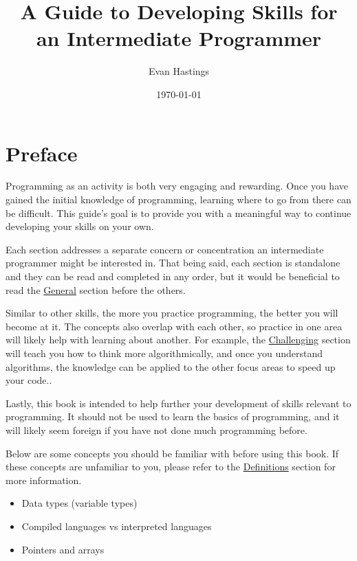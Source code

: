 \documentclass[12pt, oneside, a4paper]{book}
\title{A Guide to Developing Skills for an Intermediate Programmer}
\date{\today}
\author{Evan Hastings}
\begin{document}
   \maketitle
   \newpage
   \tableofcontents
   \lstlistoflistings
   \listoftables

   \chapter*{Preface}
      Programming as an activity is both very engaging and rewarding.
      Once you have gained the initial knowledge of programming, learning where to go from there can be difficult.
      This guide's goal is to provide you with a meaningful way to continue developing your skills on your own.

      Each section addresses a separate concern or concentration an intermediate programmer might be interested in.
      That being said, each section is standalone and they can be read and completed in any order, but it would be beneficial to read the \hyperref[chap:general]{General} section before the others.

      Similar to other skills, the more you practice programming, the better you will become at it.
      The concepts also overlap with each other, so practice in one area will likely help with learning about another.
      For example, the \hyperref[chap:challenge]{Challenging} section will teach you how to think more algorithmically, and once you understand algorithms, the knowledge can be applied to the other focus areas to speed up your code..

      Lastly, this book is intended to help further your development of skills relevant to programming.
      It should not be used to learn the basics of programming, and it will likely seem foreign if you have not done much programming before.

      Below are some concepts you should be familiar with before using this book\footnotemark.
      If these concepts are unfamiliar to you, please refer to the \hyperref[chap:def]{Definitions} section for more information.

      \begin{itemize}
         \item Data types (variable types)
         \item Compiled languages vs interpreted languages
         \item Pointers and arrays
      \end{itemize}
\end{document}
